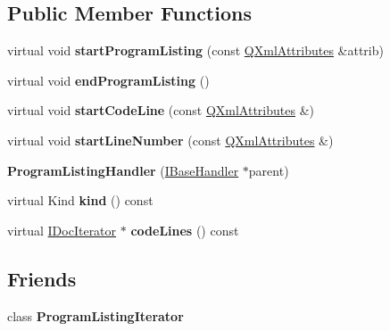 \subsection*{Public Member Functions}
\begin{DoxyCompactItemize}
\item 
\mbox{\label{class_program_listing_handler_a4c96dca5aceac76276d2e15b7c5af580}} 
virtual void {\bfseries start\+Program\+Listing} (const \mbox{\hyperlink{class_q_xml_attributes}{Q\+Xml\+Attributes}} \&attrib)
\item 
\mbox{\label{class_program_listing_handler_afdcff06eb006234d68208b9cb61b799d}} 
virtual void {\bfseries end\+Program\+Listing} ()
\item 
\mbox{\label{class_program_listing_handler_a4c24929ffe2f16801d54ed89d4fb05d9}} 
virtual void {\bfseries start\+Code\+Line} (const \mbox{\hyperlink{class_q_xml_attributes}{Q\+Xml\+Attributes}} \&)
\item 
\mbox{\label{class_program_listing_handler_a42c9deeaa970dfd34714051e635c24fd}} 
virtual void {\bfseries start\+Line\+Number} (const \mbox{\hyperlink{class_q_xml_attributes}{Q\+Xml\+Attributes}} \&)
\item 
\mbox{\label{class_program_listing_handler_a81f2a8687aa792d7d063f6d2779e4137}} 
{\bfseries Program\+Listing\+Handler} (\mbox{\hyperlink{class_i_base_handler}{I\+Base\+Handler}} $\ast$parent)
\item 
\mbox{\label{class_program_listing_handler_add4538fdd00a983aac02ed78a74fd1cf}} 
virtual Kind {\bfseries kind} () const
\item 
\mbox{\label{class_program_listing_handler_ac60dfb05d3a5a4921b6250d5bce86987}} 
virtual \mbox{\hyperlink{class_i_doc_iterator}{I\+Doc\+Iterator}} $\ast$ {\bfseries code\+Lines} () const
\end{DoxyCompactItemize}
\subsection*{Friends}
\begin{DoxyCompactItemize}
\item 
\mbox{\label{class_program_listing_handler_adfce73bc0c8b947eb07bee0086e3c2c3}} 
class {\bfseries Program\+Listing\+Iterator}
\end{DoxyCompactItemize}
